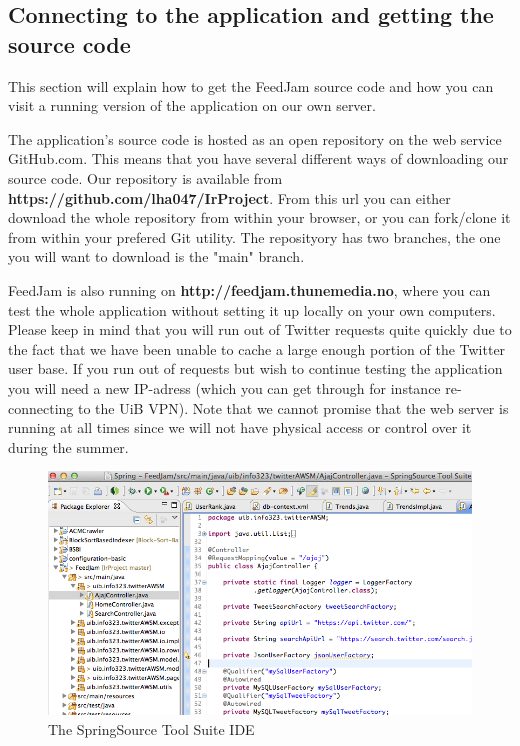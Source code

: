 \subsection{Connecting to the application and getting the source code}
This section will explain how to get the FeedJam source code and how you can visit a running version of the application on our own server.

The application's source code is hosted as an open repository on the web service GitHub.com. This means that you have several different ways of downloading our source code. Our repository is available from {\bf https://github.com/lha047/IrProject}. From this url you can either download the whole repository from within your browser, or you can fork/clone it from within your prefered Git utility. The reposityory has two branches, the one you will want to download is the "main" branch.

FeedJam is also running on {\bf http://feedjam.thunemedia.no}, where you can test the whole application without setting it up locally on your own computers. Please keep in mind that you will run out of Twitter requests quite quickly due to the fact that we have been unable to cache a large enough portion of the Twitter user base. If you run out of requests but wish to continue testing the application you will need a new IP-adress (which you can get through for instance re-connecting to the UiB VPN). Note that we cannot promise that the web server is running at all times since we will not have physical access or control over it during the summer. 

\begin{figure}[ht]
    \begin{minipage}[b]{1\linewidth}
        \centering
        \includegraphics[width=1\textwidth]{figures/springsourcetoolsuite}
        \caption{The SpringSource Tool Suite IDE}
        \label{fig:springsourcetoolsuite}
    \end{minipage}
\end{figure}